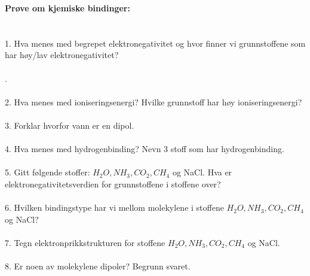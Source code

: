 \documentclass[12pt,a4paper]{article}
\author{Svein-Tore Narvestad}
\date{September 2025}
\begin{document}
\textbf{\large{Prøve om kjemiske bindinger:}}\\\\\\
1.	Hva menes med begrepet elektronegativitet og hvor finner vi grunnstoffene som har høy/lav elektronegativitet?\\\\
.\\\\
2.	Hva menes med ioniseringsenergi? Hvilke grunnstoff har høy ioniseringsenergi?\\\\

3. Forklar hvorfor vann er en dipol.\\\\

4.	Hva menes med hydrogenbinding?  Nevn 3 stoff som har hydrogenbinding.\\\\

5.	 Gitt følgende stoffer: $H_2O, NH_3, CO_2,CH_4$ og NaCl.
Hva er elektronegativitetsverdien for grunnstoffene i stoffene over?\\\\

6.	Hvilken bindingstype har vi mellom molekylene i stoffene $H_2O, NH_3, CO_2,CH_4$ og NaCl?\\\\

7.	Tegn elektronprikkstrukturen for stoffene $H_2O, NH_3, CO_2, CH_4$ og NaCl.\\\\ 
8.	Er noen av molekylene dipoler? Begrunn svaret.\\\\
  
\end{document}
